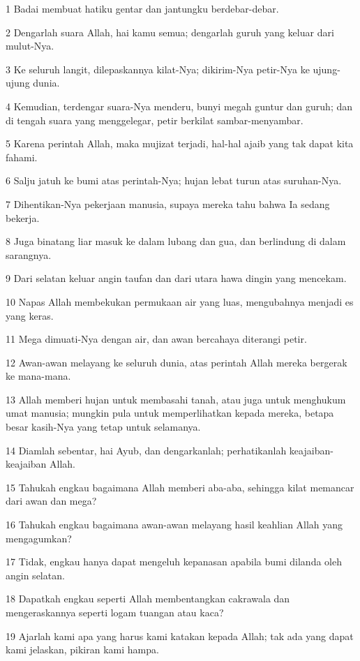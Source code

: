 \par 1 Badai membuat hatiku gentar dan jantungku berdebar-debar.
\par 2 Dengarlah suara Allah, hai kamu semua; dengarlah guruh yang keluar dari mulut-Nya.
\par 3 Ke seluruh langit, dilepaskannya kilat-Nya; dikirim-Nya petir-Nya ke ujung-ujung dunia.
\par 4 Kemudian, terdengar suara-Nya menderu, bunyi megah guntur dan guruh; dan di tengah suara yang menggelegar, petir berkilat sambar-menyambar.
\par 5 Karena perintah Allah, maka mujizat terjadi, hal-hal ajaib yang tak dapat kita fahami.
\par 6 Salju jatuh ke bumi atas perintah-Nya; hujan lebat turun atas suruhan-Nya.
\par 7 Dihentikan-Nya pekerjaan manusia, supaya mereka tahu bahwa Ia sedang bekerja.
\par 8 Juga binatang liar masuk ke dalam lubang dan gua, dan berlindung di dalam sarangnya.
\par 9 Dari selatan keluar angin taufan dan dari utara hawa dingin yang mencekam.
\par 10 Napas Allah membekukan permukaan air yang luas, mengubahnya menjadi es yang keras.
\par 11 Mega dimuati-Nya dengan air, dan awan bercahaya diterangi petir.
\par 12 Awan-awan melayang ke seluruh dunia, atas perintah Allah mereka bergerak ke mana-mana.
\par 13 Allah memberi hujan untuk membasahi tanah, atau juga untuk menghukum umat manusia; mungkin pula untuk memperlihatkan kepada mereka, betapa besar kasih-Nya yang tetap untuk selamanya.
\par 14 Diamlah sebentar, hai Ayub, dan dengarkanlah; perhatikanlah keajaiban-keajaiban Allah.
\par 15 Tahukah engkau bagaimana Allah memberi aba-aba, sehingga kilat memancar dari awan dan mega?
\par 16 Tahukah engkau bagaimana awan-awan melayang hasil keahlian Allah yang mengagumkan?
\par 17 Tidak, engkau hanya dapat mengeluh kepanasan apabila bumi dilanda oleh angin selatan.
\par 18 Dapatkah engkau seperti Allah membentangkan cakrawala dan mengeraskannya seperti logam tuangan atau kaca?
\par 19 Ajarlah kami apa yang harus kami katakan kepada Allah; tak ada yang dapat kami jelaskan, pikiran kami hampa.
